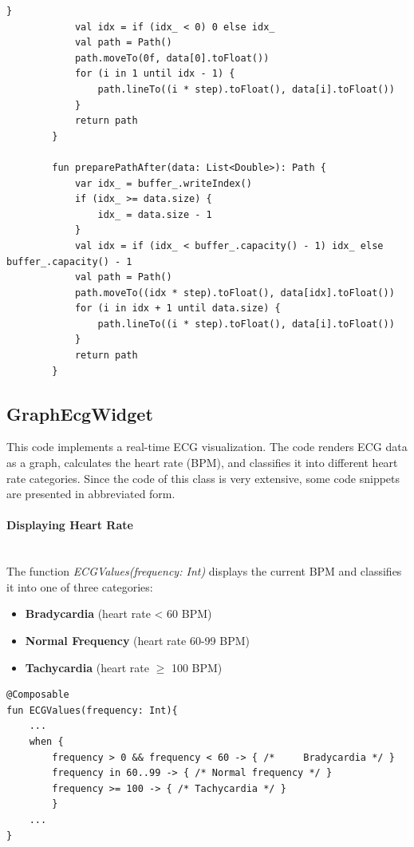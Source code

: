 {{\begin{lstlisting}[label={fig:simpleSourceGen.cs}, caption={Code to prepare the ECG-Path}]
			}
			val idx = if (idx_ < 0) 0 else idx_
			val path = Path()
			path.moveTo(0f, data[0].toFloat())
			for (i in 1 until idx - 1) {
				path.lineTo((i * step).toFloat(), data[i].toFloat())
			}
			return path
		}
		
		fun preparePathAfter(data: List<Double>): Path {
			var idx_ = buffer_.writeIndex()
			if (idx_ >= data.size) {
				idx_ = data.size - 1
			}
			val idx = if (idx_ < buffer_.capacity() - 1) idx_ else buffer_.capacity() - 1
			val path = Path()
			path.moveTo((idx * step).toFloat(), data[idx].toFloat())
			for (i in idx + 1 until data.size) {
				path.lineTo((i * step).toFloat(), data[i].toFloat())
			}
			return path
		}
	\end{lstlisting}
	\subsection{GraphEcgWidget}
	This code implements a real-time ECG visualization. The code renders ECG data as a graph, calculates the heart rate (BPM), and classifies it into different heart rate categories. Since the code of this class is very extensive, some code snippets are presented in abbreviated form.
	\mbox{}\\
	
	\paragraph{Displaying Heart Rate}\mbox{}\\
	
	The function \textit{ECGValues(frequency: Int) } displays the current BPM and classifies it into one of three categories: 
	\begin{itemize}
		\item \textbf{Bradycardia} (heart rate < 60 BPM)
		\item \textbf{Normal Frequency} (heart rate 60-99 BPM)
		\item \textbf{Tachycardia} (heart rate $ \geq$ 100 BPM)
	\end{itemize}
\begin{lstlisting}[label={fig:simpleSourceGen.cs}, caption={Code to classify current heartrate}]
@Composable
fun ECGValues(frequency: Int){
	...
	when {
		frequency > 0 && frequency < 60 -> { /* 	Bradycardia */ }
		frequency in 60..99 -> { /* Normal frequency */ }
		frequency >= 100 -> { /* Tachycardia */ }
		}
	...
}
	
\end{lstlisting}
}}
